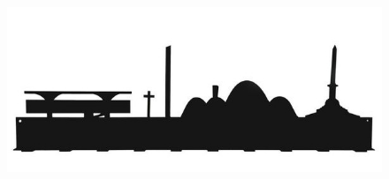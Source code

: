 \documentclass{beamer}
\begin{document}
\begin{frame}{}
  \begin{figure}[htp]
    \centering
    \includegraphics[width=\textwidth]{bh-skyline.jpg}
  \end{figure} 
\end{frame}



\end{document}
